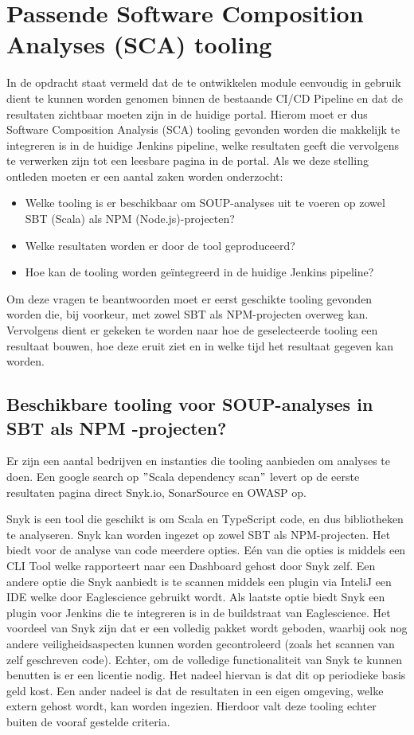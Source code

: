\section{Passende Software Composition Analyses (SCA) tooling}\label{sec:sca-tooling}

In de opdracht staat vermeld dat de te ontwikkelen module eenvoudig in gebruik dient te kunnen worden genomen binnen de bestaande CI/CD Pipeline en dat de resultaten zichtbaar moeten zijn in de huidige portal. Hierom moet er dus Software Composition Analysis (SCA) tooling gevonden worden die makkelijk te integreren is in de huidige Jenkins pipeline, welke resultaten geeft die vervolgens te verwerken zijn tot een leesbare pagina in de portal. Als we deze stelling ontleden moeten er een aantal zaken worden onderzocht:
\begin{itemize}
    \item Welke tooling is er beschikbaar om SOUP-analyses uit te voeren op zowel SBT (Scala) als NPM (Node.js)-projecten?
    \item Welke resultaten worden er door de tool geproduceerd?
    \item Hoe kan de tooling worden geïntegreerd in de huidige Jenkins pipeline?
\end{itemize}
Om deze vragen te beantwoorden moet er eerst geschikte tooling gevonden worden die, bij voorkeur, met zowel SBT als NPM-projecten overweg kan. Vervolgens dient er gekeken te worden naar hoe de geselecteerde tooling een resultaat bouwen, hoe deze eruit ziet en in welke tijd het resultaat gegeven kan worden.

\subsection{Beschikbare tooling voor SOUP-analyses in SBT als NPM -projecten?}\label{subsec:ESTooling}
Er zijn een aantal bedrijven en instanties die tooling aanbieden om analyses te doen. Een google search op $"$Scala dependency scan$"$ levert op de eerste resultaten pagina direct Snyk.io, SonarSource en OWASP op.

Snyk is een tool die geschikt is om Scala en TypeScript code, en dus bibliotheken te analyseren. Snyk kan worden ingezet op zowel SBT als NPM-projecten. Het biedt voor de analyse van code meerdere opties. Eén van die opties is middels een CLI Tool welke rapporteert naar een Dashboard gehost door Snyk zelf. Een andere optie die Snyk aanbiedt is te scannen middels een plugin via InteliJ een IDE welke door Eaglescience gebruikt wordt. Als laatste optie biedt Snyk een plugin voor Jenkins die te integreren is in de buildstraat van Eaglescience. Het voordeel van Snyk zijn dat er een volledig pakket wordt geboden, waarbij ook nog andere veiligheidsaspecten kunnen worden gecontroleerd (zoals het scannen van zelf geschreven code). Echter, om de volledige functionaliteit van Snyk te kunnen benutten is er een licentie nodig. Het nadeel hiervan is dat dit op periodieke basis geld kost. Een ander nadeel is dat de resultaten in een eigen omgeving, welke extern gehost wordt, kan worden ingezien. Hierdoor valt deze tooling echter buiten de vooraf gestelde criteria.

